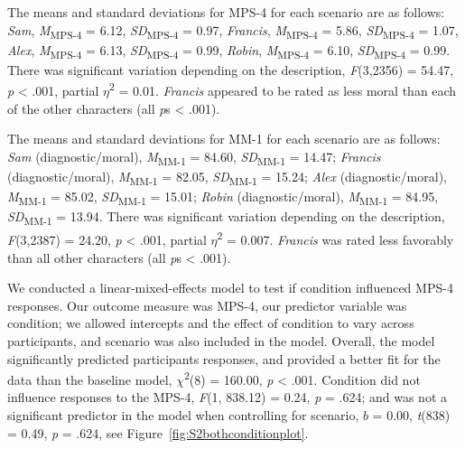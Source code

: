 \documentclass[
  man,floatsintext]{apa6}
\begin{document}
The means and standard deviations for MPS-4 for each scenario are as follows:
\emph{Sam},
\emph{M}\textsubscript{MPS-4} = 6.12, \emph{SD}\textsubscript{MPS-4} = 0.97,
\emph{Francis},
\emph{M}\textsubscript{MPS-4} = 5.86, \emph{SD}\textsubscript{MPS-4} = 1.07,
\emph{Alex},
\emph{M}\textsubscript{MPS-4} = 6.13, \emph{SD}\textsubscript{MPS-4} = 0.99,
\emph{Robin},
\emph{M}\textsubscript{MPS-4} = 6.10, \emph{SD}\textsubscript{MPS-4} = 0.99. There was significant variation depending on the description, \emph{F}(3,2356) = 54.47, \emph{p} \textless{} .001, partial \(\eta\)\textsuperscript{2} = 0.01. \emph{Francis} appeared to be rated as less moral than each of the other characters (all \emph{p}s \textless{} .001).

The means and standard deviations for MM-1 for each scenario are as follows:
\emph{Sam} (diagnostic/moral),
\emph{M}\textsubscript{MM-1} = 84.60, \emph{SD}\textsubscript{MM-1} = 14.47;
\emph{Francis} (diagnostic/moral),
\emph{M}\textsubscript{MM-1} = 82.05, \emph{SD}\textsubscript{MM-1} = 15.24;
\emph{Alex} (diagnostic/moral),
\emph{M}\textsubscript{MM-1} = 85.02, \emph{SD}\textsubscript{MM-1} = 15.01;
\emph{Robin} (diagnostic/moral),
\emph{M}\textsubscript{MM-1} = 84.95, \emph{SD}\textsubscript{MM-1} = 13.94. There was significant variation depending on the description, \emph{F}(3,2387) = 24.20, \emph{p} \textless{} .001, partial \(\eta\)\textsuperscript{2} = 0.007. \emph{Francis} was rated less favorably than all other characters (all \emph{p}s \textless{} .001).

We conducted a linear-mixed-effects model to test if condition influenced MPS-4 responses. Our outcome measure was MPS-4, our predictor variable was condition; we allowed intercepts and the effect of condition to vary across participants, and scenario was also included in the model.
Overall, the model significantly predicted participants responses, and provided a better fit for the data than the baseline model, \(\chi\)\textsuperscript{2}(8) = 160.00, \emph{p} \textless{} .001. Condition did not influence responses to the MPS-4, \emph{F}(1, 838.12) = 0.24, \emph{p} = .624; and was not a significant predictor in the model when controlling for scenario, \(b\) = 0.00, \emph{t}(838) = 0.49, \emph{p} = .624, see Figure~\ref{fig:S2bothconditionplot}.
\end{document}
